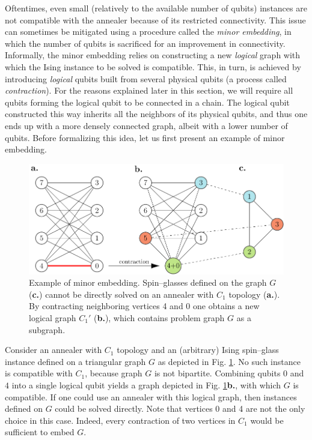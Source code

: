 Oftentimes, even small (relatively to the available number of qubits) instances
are not compatible with the annealer because of its restricted connectivity.
This issue can sometimes be mitigated using a procedure called the \emph{minor
  embedding}, in which the number of qubits is sacrificed for an improvement in
connectivity. Informally, the minor embedding relies on constructing a new
\emph{logical} graph with which the Ising instance to be solved is compatible.
This, in turn, is achieved by introducing \emph{logical} qubits built from
several physical qubits (a process called \emph{contraction}). For the reasons
explained later in this section, we will require all qubits forming the logical
qubit to be connected in a chain. The logical qubit constructed this way
inherits all the neighbors of its physical qubits, and thus one ends up with a
more densely connected graph, albeit with a lower number of qubits. Before
formalizing this idea, let us first present an example of minor embedding.

\begin{example}
  \label{ex:minor-embedding}
  \begin{figure}[b]
    \includegraphics[width=\textwidth]{figures/minor-embedding}
    \caption{
      Example of minor embedding. Spin--glasses defined on the graph $G$
      (\textbf{c.}) cannot be directly solved on an annealer with $C_1$ topology
      (\textbf{a.}). By contracting neighboring vertices 4 and 0 one obtains a new
      logical graph $C_1'$ (\textbf{b.}), which contains problem graph $G$ as a
      subgraph. } \label{fig:minor-embedding}
  \end{figure}

  Consider an annealer with $C_1$ topology and an (arbitrary) Ising spin--glass
  instance defined on a triangular graph $G$ as depicted in Fig.
  \ref{fig:minor-embedding}. No such instance is compatible with $C_1$, because
  graph $G$ is not bipartite. Combining qubits $0$ and $4$ into a single logical
  qubit yields a graph depicted in Fig. \ref{fig:minor-embedding}\textbf{b.},
  with which $G$ is compatible. If one could use an annealer with this logical
  graph, then instances defined on $G$ could be solved directly. Note that
  vertices 0 and 4 are not the only choice in this case. Indeed, every
  contraction of two vertices in $C_1$ would be sufficient to embed $G$.
\end{example}

